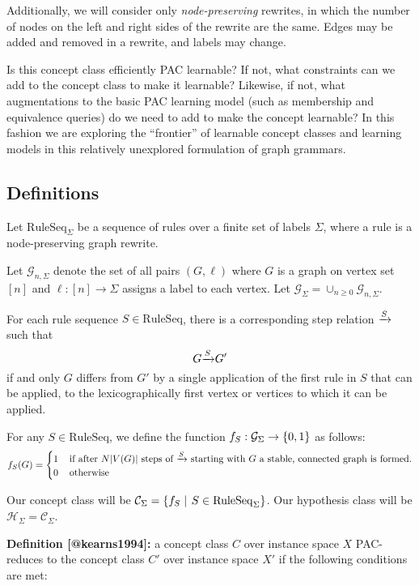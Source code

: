 \documentclass[]{article}
\def\RuleSeq{\mathrm{RuleSeq}\xspace}
\def\Graphs{\mathcal{G}\xspace}
\def\Concepts{\mathcal{C}\xspace}
\def\Hypotheses{\mathcal{H}\xspace}
\begin{document}
Additionally, we will consider only \emph{node-preserving} rewrites, in
which the number of nodes on the left and right sides of the rewrite are
the same. Edges may be added and removed in a rewrite, and labels may
change.

Is this concept class efficiently PAC learnable? If not, what
constraints can we add to the concept class to make it learnable?
Likewise, if not, what augmentations to the basic PAC learning model
(such as membership and equivalence queries) do we need to add to make
the concept learnable? In this fashion we are exploring the ``frontier''
of learnable concept classes and learning models in this relatively
unexplored formulation of graph grammars.

\subsection{Definitions}\label{definitions}

Let \(\RuleSeq_\Sigma\) be a sequence of rules over a finite set of
labels \(\Sigma\), where a rule is a node-preserving graph rewrite.

Let \(\Graphs_{n,\Sigma}\) denote the set of all pairs \((G,\ell)\)
where \(G\) is a graph on vertex set \([n]\) and
\(\ell : [n] \to \Sigma\) assigns a label to each vertex. Let
\(\Graphs_{\Sigma} = \cup_{n\geq 0} \Graphs_{n,\Sigma}\).

For each rule sequence \(S\in \RuleSeq\), there is a corresponding step
relation \(\xrightarrow{S}\) such that \[G {\xrightarrow{S}} G'\] if and only \(G\)
differs from \(G'\) by a single application of the first rule in \(S\)
that can be applied, to the lexicographically first vertex or vertices
to which it can be applied.

For any \(S\in \RuleSeq\), we define the function
\(f_S : \Graphs_{\Sigma} \to \Set{0,1}\) as follows:
\[f_S(G) = \begin{cases}
    1 &\,\text{if after $N |V(G)|$ steps of ${\xrightarrow{S}}$ starting with $G$ a
    stable, connected graph is formed.}\\
    0 &\,\text{otherwise}
  \end{cases}\]

Our concept class will be
\(\Concepts_\Sigma = \Setbar{f_S}{S\in \RuleSeq_\Sigma}\). Our
hypothesis class will be \(\Hypotheses_{\Sigma} = \Concepts_\Sigma\).

\textbf{Definition {[}@kearns1994{]}:} a concept class \(C\) over
instance space \(X\) PAC-reduces to the concept class \(C'\) over
instance space \(X'\) if the following conditions are met:
\end{document}
